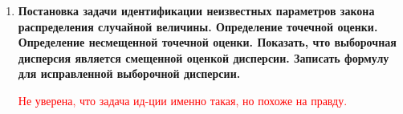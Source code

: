 \documentclass[12pt]{report}
\begin{document}
\begin{enumerate}
\begin{figure}[!h]
	\end{figure}
	\begin{figure}[!h]
	\end{figure}
	
	\item \textbf{Постановка задачи идентификации неизвестных параметров закона распределения случайной величины. Определение точечной оценки. Определение несмещенной точечной оценки. Показать, что выборочная дисперсия является смещенной оценкой дисперсии. Записать формулу
		для исправленной выборочной дисперсии.}
	
	\textcolor{red}{Не уверена, что задача ид-ции именно такая, но похоже на правду.}
	

\end{enumerate}
\end{document}
